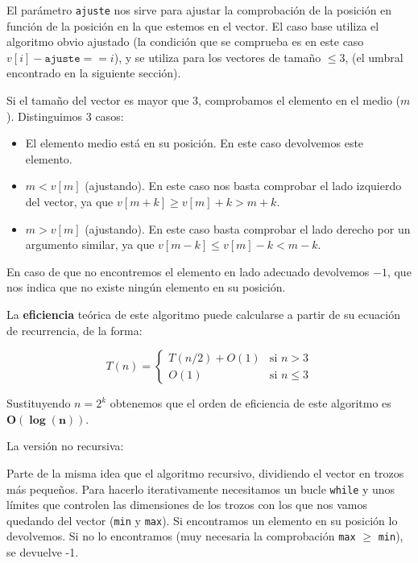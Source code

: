 

El parámetro \texttt{ajuste} nos sirve para ajustar la comprobación de la posición en función de la posición en la que estemos en el vector.
El caso base utiliza el algoritmo obvio ajustado (la condición que se comprueba es en este caso $v[i]-\texttt{ajuste} == i$), y se utiliza para los vectores de tamaño $\leq 3$, (el umbral encontrado en la siguiente sección).

\newpage

Si el tamaño del vector es mayor que 3, comprobamos el elemento en el medio ($m$).
Distinguimos 3 casos:

\begin{itemize}
  \item El elemento medio está en su posición. En este caso devolvemos este elemento.
  \item $m < v[m]$ (ajustando). En este caso nos basta comprobar el lado izquierdo del vector, ya que $v[m + k] \geq v[m] + k > m + k$.
  \item $m > v[m]$ (ajustando). En este caso basta comprobar el lado derecho por un argumento similar, ya que $v[m - k] \leq v[m] - k < m - k$.
\end{itemize}

En caso de que no encontremos el elemento en lado adecuado devolvemos $-1$, que nos indica que no existe ningún elemento en su posición.

La \textbf{eficiencia} teórica de este algoritmo puede calcularse a partir de su ecuación de recurrencia, de la forma:

\[
T(n) = \begin{cases} T(n/2) + O(1) & \mbox{si } n > 3 \\
O(1) & \mbox{si } n \leq 3 \end{cases}\]

Sustituyendo $n = 2^k$ obtenemos que el orden de eficiencia de este algoritmo es $\mathbf{O(\log(n))}$.

\vspace*{0.3cm}
\noindent\hrulefill
\vspace*{0.3cm}

La versión no recursiva:



Parte de la misma idea que el algoritmo recursivo, dividiendo el vector en trozos más pequeños. Para hacerlo iterativamente necesitamos un bucle \texttt{while} y unos límites que controlen las dimensiones de los trozos con los que nos vamos quedando del vector (\texttt{min} y \texttt{max}). Si encontramos un elemento en su posición lo devolvemos. Si no lo encontramos (muy necesaria la comprobación \texttt{max} $\geq$ \texttt{min}), se devuelve -1.


